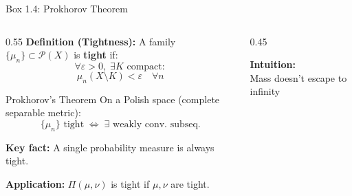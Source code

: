 \documentclass[aspectratio=169]{beamer}
\newcommand{\Pp}{\mathcal{P}}
\begin{document}
\begin{frame}{Box 1.4: Prokhorov Theorem}
\begin{columns}
\begin{column}{0.55\textwidth}
\textbf{Definition (Tightness):}
A family $\{\mu_n\} \subset \Pp(X)$ is \textbf{tight} if:
\[
\forall \varepsilon > 0, \; \exists K \text{ compact}:
\]
\[
\mu_n(X \setminus K) < \varepsilon \quad \forall n
\]

\vspace{0.3cm}
\begin{block}{Prokhorov's Theorem}
On a Polish space (complete separable metric):
\[
\{\mu_n\} \text{ tight} \;\Leftrightarrow\; \exists \text{ weakly conv. subseq.}
\]
\end{block}

\vspace{0.3cm}
\textbf{Key fact:} A single probability measure is always tight.

\textbf{Application:} $\Pi(\mu,\nu)$ is tight if $\mu, \nu$ are tight.
\end{column}
\begin{column}{0.45\textwidth}
\begin{center}

\vspace{0.3cm}
\textbf{Intuition:}\\
Mass doesn't escape to infinity
\end{center}
\end{column}
\end{columns}
\end{frame}
\end{document}
